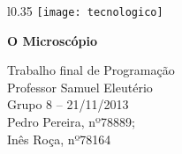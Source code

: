 \documentclass{article}
\author{Pedro Pereira, nº78889; Inês Roça, nº78164}
\date{december 29, 2013}
\begin{document}
\begin{wrapfigure}{l}{0.35\textwidth}
\vspace*{-3.5cm}
\hspace*{6.2cm}
    \texttt{[image: tecnologico]}
\end{wrapfigure}


\begin{flushright}
\begin{framed}
\begin{center} 
{\Huge\textbf{ O Microscópio}}
\vspace{.5cm}
\end{center}
{\large Trabalho final de Programação\\ Professor Samuel Eleutério\\Grupo 8 – 21/11/2013\\Pedro Pereira, nº78889;\\Inês Roça, nº78164}
\end{framed}
\end{flushright}

\end{document}
